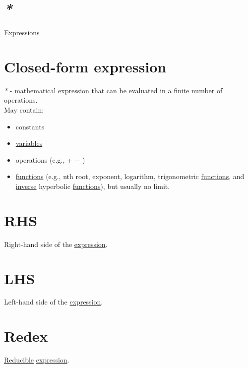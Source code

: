 \documentclass[a4paper,14pt,oneside]{book}
\begin{document}
\section{\emph{*}}
\label{sec:org36d01a4}

\label{orgae6a816}Expressions\\

\section{\label{orgcbda532}Closed-form expression}
\label{sec:org5fc3a96}
\emph{*} - mathematical \hyperref[org3ea9088]{expression} that can be evaluated in a finite number of operations.\\

May contain:\\
\begin{itemize}
\item constants\\
\item \hyperref[org329012b]{variables}\\
\item operations (e.g., + − \texttimes{} \textdiv{})\\
\item \hyperref[org2d0eb2e]{functions} (e.g., nth root, exponent, logarithm, trigonometric \hyperref[org2d0eb2e]{functions}, and \hyperref[orgf753d3c]{inverse} hyperbolic \hyperref[org2d0eb2e]{functions}), but usually no limit.\\
\end{itemize}

\section{\label{org33c2866}RHS}
\label{sec:org654d727}
Right-hand side of the \hyperref[org3ea9088]{expression}.\\

\section{\label{org1013490}LHS}
\label{sec:org74d5a27}
Left-hand side of the \hyperref[org3ea9088]{expression}.\\

\section{\label{org1a230f9}Redex}
\label{sec:orgbbe7c6d}
\hyperref[orgd59a251]{Reducible} \hyperref[org3ea9088]{expression}.\\
\end{document}
